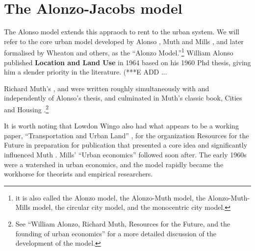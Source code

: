 \section{The Alonzo-Jacobs model}


The Alonso model extends this appraoch to rent to the urban system.
We will refer to the core urban model developed by Alonso \cite{alonsoLocationLandUse1964}, Muth \cite{muthCitiesHousingSpatial1969} and Mills \cite{millsAggregativeModelResource1967}, and later formalised by Wheaton \cite{wheatonComparativeStaticAnalysis1974} and others, as the ``Alonzo Model.''\footnote{it is also called the Alonzo model, the Alonzo-Muth model, the Alonzo-Muth-Mills model, the circular city model, and the monocentric city model.} William Alonso published \textbf{Location and Land Use} in 1964  \cite{alonsoLocationLandUse1964} based on his 1960 Phd thesis,\cite{alonsoModelUrbanLand1960} 
giving him a slender priority in the literature.  (***E ADD ... %

Richard Muth's \cite{muthSpatialStructureHousing1961}, and \cite{muthRationalExpectationsTheory1961}  were written roughly simultaneously with and independently of Alonso's thesis, and  culminated in Muth's classic book, Cities and Housing  \cite{muthCitiesHousingSpatial1969}.\footnote{See ``William Alonzo, Richard Muth, Resources for  the Future, and the founding of urban economics''\cite{mcdonaldWilliamAlonsoRichard2007} for a more detailed discussion of the development of the model.}  %

It is worth noting that Lowdon Wingo also had what appears to be a working paper, ``Transportation and Urban Land'' \cite{wingoTransportationUrbanLand1961}, for the organization Resources for the Future  in preparation for publication that presented a core idea and  significantly influenced Muth \cite{mcdonaldWilliamAlonsoRichard2007}. Mills' ``Urban economics'' \cite{millsUrbanEconomics1972} followed soon after. The early 1960s were a watershed in urban economics, and the model rapidly became the workhorse for theorists and empirical researchers.

